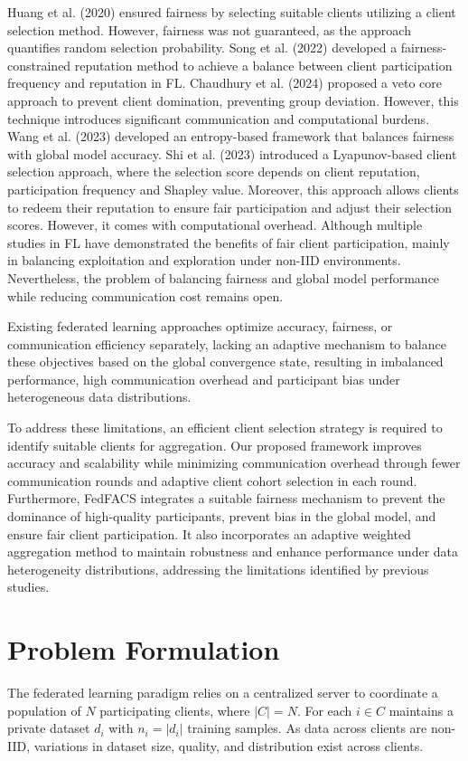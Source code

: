 \documentclass[pdflatex,sn-mathphys-num,oneside]{sn-jnl}%
\theoremstyle{thmstyleone}%
\theoremstyle{thmstyletwo}%
\theoremstyle{thmstylethree}%
\begin{document}
Huang et al. (2020) ensured fairness by selecting suitable clients utilizing a client selection method. However, fairness was not guaranteed, as the approach quantifies random selection probability. Song et al. (2022) developed a fairness-constrained reputation method to achieve a balance between client participation frequency and reputation in FL. Chaudhury et al. (2024) proposed a veto core approach to prevent client domination, preventing group deviation. However, this technique introduces significant communication and computational burdens. Wang et al. (2023) developed an entropy-based framework that balances fairness with global model accuracy. Shi et al. (2023) introduced a Lyapunov-based client selection approach, where the selection score depends on client reputation, participation frequency and Shapley value. Moreover, this approach allows clients to redeem their reputation to ensure fair participation and adjust their selection scores. However, it comes with computational overhead. Although multiple studies in FL have demonstrated the benefits of fair client participation, mainly in balancing exploitation and exploration under non-IID environments. Nevertheless, the problem of balancing fairness and global model performance while reducing communication cost remains open.

Existing federated learning approaches optimize accuracy, fairness, or communication efficiency separately, lacking an adaptive mechanism to balance these objectives based on the global convergence state, resulting in imbalanced performance, high communication overhead and participant bias under heterogeneous data distributions.

To address these limitations, an efficient client selection strategy is required to identify suitable clients for aggregation. Our proposed framework improves accuracy and scalability while minimizing communication overhead through fewer communication rounds and adaptive client cohort selection in each round. Furthermore, FedFACS integrates a suitable fairness mechanism to prevent the dominance of high-quality participants, prevent bias in the global model, and ensure fair client participation. It also incorporates an adaptive weighted aggregation method to maintain robustness and enhance performance under data heterogeneity distributions, addressing the limitations identified by previous studies.

\section{Problem Formulation }\label{sec3}
The federated learning paradigm relies on a centralized server to coordinate a population of $N$ participating clients, where $|C|=N$. For each $i \in C$ maintains a private dataset $d_i$ with $n_i=|d_i|$ training samples. As data across clients are non-IID, variations in dataset size, quality, and distribution exist across clients.
\end{document}
